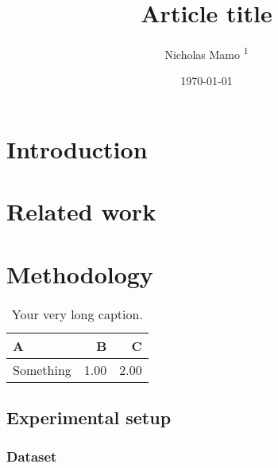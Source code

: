\documentclass[twocolumn]{elegantarticle}
\title{Article title}
\author{Nicholas Mamo \textsuperscript{1}}
\affiliation{\textsuperscript{1} Independent}
\date{\today}
\begin{document}
	\maketitle
	
	\section{Introduction}
	
		\lipsum[1-3]
	
	\section{Related work}
	
		\lipsum[4-8]
		
	\section{Methodology}
	
		\lipsum[9]
		
		\begin{table}[t!]
			\begin{tabularx}{\linewidth}{ X r r }
				\textbf{A} & \textbf{B} & \textbf{C} \\ \hline
				Something & 1.00 & 2.00 \\
			\end{tabularx}
			\caption{\label{demo-table} Your very long caption.}
		\end{table}
		
		\subsection{Experimental setup}
		
			\lipsum[10]
			
			\subsubsection{Dataset}
			
				\lipsum[11]
\end{document}
